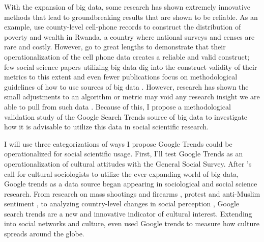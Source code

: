 With the expansion of big data, some research has shown extremely
innovative methods that lead to groundbreaking results that are shown to
be reliable. As an example, \citet{blumenstockPredictingPovertyWealth2015} use
county-level cell-phone records to construct the distribution of poverty
and wealth in Rwanda, a country where national surveys and censes are
rare and costly. However, \citet{blumenstockPredictingPovertyWealth2015} go to
great lengths to demonstrate that their operationalization of the cell
phone data creates a reliable and valid construct; few social science
papers utilizing big data dig into the construct validity of their
metrics to this extent and even fewer publications focus on
methodological guidelines of how to use sources of big data
\citep{asseoTrackingCOVID19Using2020, stilesAssessingCriterionValidity2018}.
However, research has shown the small adjustments to an algorithm or
metric may void any research insight we are able to pull from such data
\citep{lazerParableGoogleFlu2014}. Because of this, I propose a
methodological validation study of the Google Search Trends source of
big data to investigate how it is advisable to utilize this data in
social scientific research.

I will use three categorizations of ways I propose Google Trends could
be operationalized for social scientific usage. First, I'll test Google
Trends as an operationalization of cultural attitudes with the General
Social Survey. After \citet{bailCulturalEnvironmentMeasuring2014}'s call for
cultural sociologists to utilize the ever-expanding world of big data,
Google trends as a data source began appearing in sociological and
social science research. From research on mass shootings and firearms
\citep{brownsteinInternetSearchPatterns2020,
semenzaInformationseekingWakeTragedy2020}, protest and anti-Muslim
sentiment \citep{bailUsingInternetSearch2018,
barrieSearchingRacismGeorge2020, grossThereFergusonEffect2017}, to
analyzing country-level changes in social perception \citep{reyes_etal18},
Google search trends are a new and innovative indicator of cultural
interest. Extending into social networks and culture,
\citet{bailPrestigeProximityPrejudice2019} even used Google trends to measure
how culture spreads around the globe.

